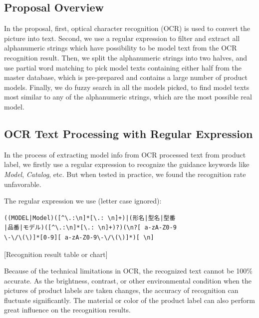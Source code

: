 \documentclass[technicalreport]{ieicej}
\begin{document}
    \subsection{Proposal Overview}
        In the proposal, first, optical character recognition (OCR) is used to convert the picture into text. Second, we use a regular expression to filter and extract all alphanumeric strings which have possibility to be model text from the OCR recognition result. Then, we split the alphanumeric strings into two halves, and use partial word matching to pick model texts containing either half from the master database, which is pre-prepared and contains a large number of product models. Finally, we do fuzzy search in all the models picked, to find model texts most similar to any of the alphanumeric strings, which are the most possible real model. 
        
    \subsection{OCR Text Processing with Regular Expression}
    \label{sec:algorithm.ocrregex}
        In the process of extracting model info from OCR processed text from product label, we firstly use a regular expression to recognize the guidance keywords like {\em Model}, {\em Catalog}, etc. But when tested in practice, we found the recognition rate unfavorable.
        
        The regular expression we use (letter case ignored):

        \begin{center}
        \begin{BVerbatim}
((MODEL|Model)([^\.:\n]*[\.: \n]+)|(形名|型名|型番
|品番|モデル)([^\.:\n]*[\.: \n]+)?)(\n?[ a-zA-Z0-9
\-\/\(\)]*[0-9][ a-zA-Z0-9\-\/\(\)]*)[ \n]
        \end{BVerbatim}
        \end{center}

        [Recognition result table or chart] 
        \vspace*{\baselineskip}

        Because of the technical limitations in OCR, the recognized text cannot be 100\% accurate. As the brightness, contrast, or other environmental condition when the pictures of product labels are taken changes, the accuracy of recognition can fluctuate significantly. The material or color of the product label can also perform great influence on the recognition results.
        
\end{document}
